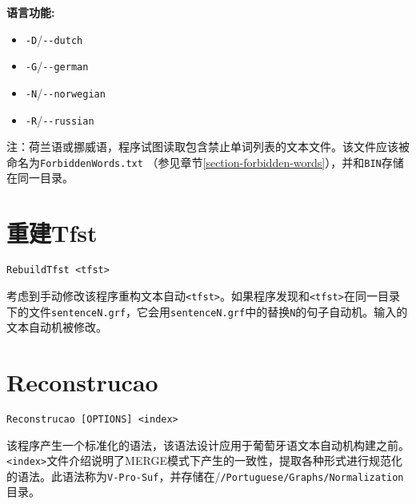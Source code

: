 \bigskip
\noindent \textbf{语言功能:}
\begin{itemize}
  \item \verb+-D+/\verb+--dutch+
  \item \verb+-G+/\verb+--german+
  \item \verb+-N+/\verb+--norwegian+
  \item \verb+-R+/\verb+--russian+
\end{itemize}  

\bigskip
\noindent 注：荷兰语或挪威语，程序试图读取包含禁止单词列表的文本文件。该文件应该被命名为\verb+ForbiddenWords.txt+ （参见章节\ref{section-forbidden-words}），并和\verb+BIN+存储在同一目录。



\section{重建Tfst}
\verb+RebuildTfst <tfst>+

\bigskip
\noindent {}
考虑到手动修改该程序重构文本自动\verb+<tfst>+。如果程序发现和\verb+<tfst>+在同一目录下的文件\verb+sentenceN.grf+，它会用\verb+sentenceN.grf+中的替换\verb+N+的句子自动机。输入的文本自动机被修改。






\section{Reconstrucao}
\verb+Reconstrucao [OPTIONS] <index>+

\bigskip
\noindent 该程序产生一个标准化的语法，该语法设计应用于葡萄牙语文本自动机构建之前。\verb+<index>+文件介绍说明了MERGE模式下产生的一致性，提取各种形式进行规范化的语法。此语法称为\verb+V-Pro-Suf+，并存储在/\verb+/Portuguese/Graphs/Normalization+目录。

